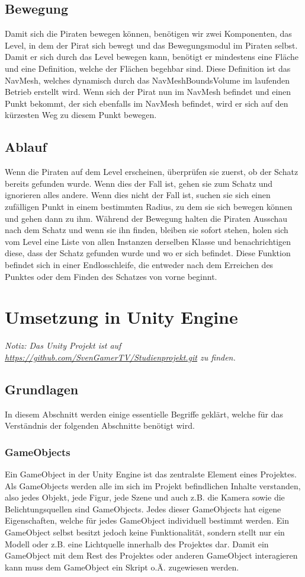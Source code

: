 \documentclass[
	12pt, %
	a4paper,
	listof=totoc, %
	bibliography=totoc, %
	numbers=noenddot, %
	ngerman, %
	headsepline, %
	oneside %
	]{scrbook} %
\begin{document}
\subsection{Bewegung}
Damit sich die Piraten bewegen können, benötigen wir zwei Komponenten, das Level, in dem der Pirat sich bewegt und das Bewegungsmodul im Piraten selbst. Damit er sich durch das Level bewegen kann, benötigt er mindestens eine Fläche und eine Definition, welche der Flächen begehbar sind. Diese Definition ist das \gls{NavMesh}, welches dynamisch durch das NavMeshBoundsVolume im laufenden Betrieb erstellt wird. Wenn sich der Pirat nun im \gls{NavMesh} befindet und einen Punkt bekommt, der sich ebenfalls im \gls{NavMesh} befindet, wird er sich auf den kürzesten Weg zu diesem Punkt bewegen.

\subsection{Ablauf}
Wenn die Piraten auf dem Level erscheinen, überprüfen sie zuerst, ob der Schatz bereits gefunden wurde. Wenn dies der Fall ist, gehen sie zum Schatz und ignorieren alles andere. Wenn dies nicht der Fall ist, suchen sie sich einen zufälligen Punkt in einem bestimmten Radius, zu dem sie sich bewegen können und gehen dann zu ihm. Während der Bewegung halten die Piraten Ausschau nach dem Schatz und wenn sie ihn finden, bleiben sie sofort stehen, holen sich vom Level eine Liste von allen Instanzen derselben Klasse und benachrichtigen diese, dass der Schatz gefunden wurde und wo er sich befindet.
Diese Funktion befindet sich in einer Endlosschleife, die entweder nach dem Erreichen des Punktes oder dem Finden des Schatzes von vorne beginnt.

\section{Umsetzung in Unity Engine}
\emph{Notiz: Das Unity Projekt ist auf \url{https://github.com/SvenGamerTV/Studienprojekt.git} zu finden.} \\
\subsection{Grundlagen}
In diesem Abschnitt werden einige essentielle Begriffe geklärt, welche für das Verständnis der folgenden Abschnitte benötigt wird.
\subsubsection{GameObjects}
Ein GameObject in der Unity Engine ist das zentralste Element eines Projektes. Als GameObjects werden alle im sich im Projekt befindlichen Inhalte verstanden, also jedes Objekt, jede Figur, jede Szene und auch z.B. die Kamera sowie die Belichtungsquellen sind GameObjects. Jedes dieser GameObjects hat eigene Eigenschaften, welche für jedes GameObject individuell bestimmt werden. Ein GameObject selbst besitzt jedoch keine Funktionalität, sondern stellt nur ein Modell oder z.B. eine Lichtquelle innerhalb des Projektes dar. Damit ein GameObject mit dem Rest des Projektes oder anderen GameObject interagieren kann muss dem GameObject ein Skript o.Ä. zugewiesen werden.
\end{document}
